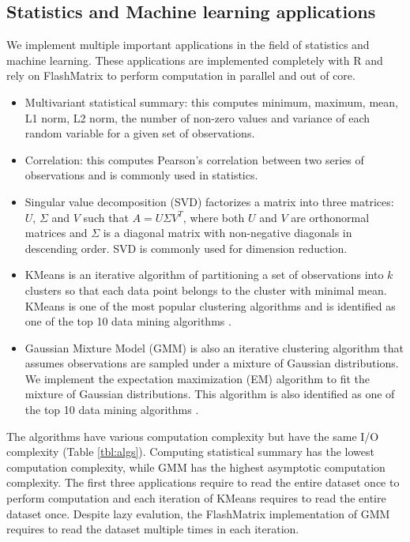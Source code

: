 \subsection{Statistics and Machine learning applications} \label{sec:apps}
We implement multiple important applications in the field of statistics and
machine learning. These applications are implemented completely with R and
rely on FlashMatrix to perform computation in parallel and out of core.
\begin{itemize}
	\item Multivariant statistical summary: this computes minimum, maximum,
		mean, L1 norm, L2 norm, the number of non-zero values
		and variance of each random variable for a given set of observations.
	\item Correlation: this computes Pearson's correlation \cite{} between
		two series of observations and is commonly used in statistics.
	\item Singular value decomposition (SVD) \cite{} factorizes a matrix into
		three matrices: $U$, $\Sigma$ and $V$ such that $A=U \Sigma V^T$, where
		both $U$ and $V$ are orthonormal matrices and $\Sigma$ is a diagonal
		matrix with non-negative diagonals in descending order. SVD is commonly
		used for dimension reduction.
	\item KMeans \cite{kmeans} is an iterative algorithm of partitioning a set
		of observations into $k$ clusters
		so that each data point belongs to the cluster with minimal mean. KMeans
		is one of the most popular clustering algorithms and is identified as
		one of the top 10 data mining algorithms \cite{top10}.
	\item Gaussian Mixture Model (GMM) \cite{gmm} is also an iterative
		clustering algorithm that assumes observations are sampled under
		a mixture of Gaussian distributions. We implement the expectation
		maximization (EM) \cite{em} algorithm to fit
		the mixture of Gaussian distributions. This algorithm is also identified
		as one of the top 10 data mining algorithms \cite{top10}.
\end{itemize}

The algorithms have various computation complexity but have the same I/O
complexity (Table \ref{tbl:algs}). Computing statistical summary
has the lowest computation complexity, while GMM has the highest asymptotic
computation complexity. The first three applications require to read the entire
dataset once to perform computation and each iteration of KMeans requires to
read the entire dataset once. Despite lazy evalution, the FlashMatrix
implementation of GMM requires to read the dataset multiple times in each
iteration.

